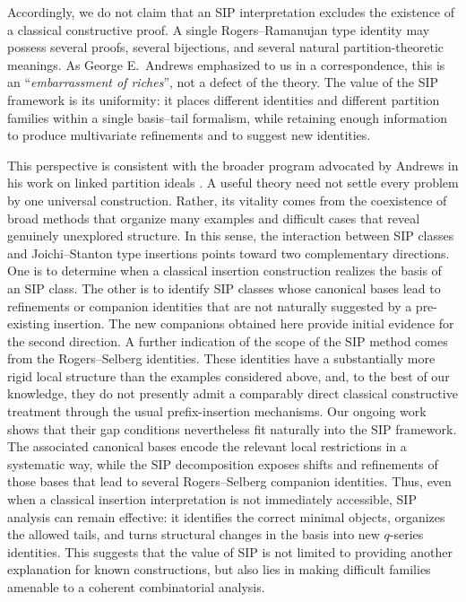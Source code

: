 \documentclass[11pt]{amsart}
\theoremstyle{definition}
\theoremstyle{remark}
\numberwithin{equation}{section}
\begin{document}
Accordingly, we do not claim that an SIP interpretation excludes the existence of a classical constructive proof. A single Rogers--Ramanujan type identity may possess several proofs, several bijections, and several natural partition-theoretic meanings.  As George E.~Andrews emphasized to us in a correspondence, this is an ``\emph{embarrassment of riches}'', not a defect of the theory. The value of the SIP framework is its uniformity: it places different identities and different partition families within a single basis--tail formalism, while retaining enough information to produce multivariate refinements and to suggest new identities.

This perspective is consistent with the broader program advocated by Andrews in his work on linked partition ideals \cite{AndrewsLinked}. A useful theory need not settle every problem by one universal construction. Rather, its vitality comes from the coexistence of broad methods that organize many examples and difficult cases that reveal genuinely unexplored structure. In this sense, the interaction between SIP classes and Joichi--Stanton type insertions points toward two complementary directions. One is to determine when a classical insertion construction realizes the basis of an SIP class. The other is to identify SIP classes whose canonical bases lead to refinements or companion identities that are not naturally suggested by a pre-existing insertion. The new companions obtained here provide initial evidence for the second direction. A further indication of the scope of the SIP method comes from the Rogers--Selberg identities. These identities have a substantially more rigid local structure than the examples considered above, and, to the best of our knowledge, they do not presently admit a comparably direct classical constructive treatment through the usual prefix-insertion mechanisms. Our ongoing work shows that their gap conditions nevertheless fit naturally into the SIP framework. The associated canonical bases encode the relevant local restrictions in a systematic way, while the SIP decomposition exposes shifts and refinements of those bases that lead to several Rogers--Selberg companion identities. Thus, even when a classical insertion interpretation is not immediately accessible, SIP analysis can remain effective: it identifies the correct minimal objects, organizes the allowed tails, and turns structural changes in the basis into new $q$-series identities.  This suggests that the value of SIP is not limited to providing another explanation for known constructions, but also lies in making difficult families amenable to a coherent combinatorial analysis.
\end{document}
